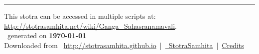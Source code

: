 \documentclass[oneside,12pt]{book}
\begin{document}
\setmainfont[Script=Devanagari,Mapping=tex-text]{Sanskrit 2003}
\fontsize {16}{19.25}\selectfont
\begin{center}

\end{center}
\vfill
\centering
\rule{0.8\textwidth}{0.6pt}

\footnotesize
{}\sffamily
This stotra can be accessed in multiple scripts at:\\
\url{http://stotrasamhita.net/wiki/Ganga_Sahasranamavali}.\\[1ex]
\faFilePdfO~generated on \textbf{\today}\\[1ex]
Downloaded from \faGlobe{}~\url{http://stotrasamhita.github.io}~|~\href{https://github.com/StotraSamhita}{\faGithubSquare{}~StotraSamhita}~|~\href{https://stotrasamhita.github.io/about/}{Credits}
\end{document}
